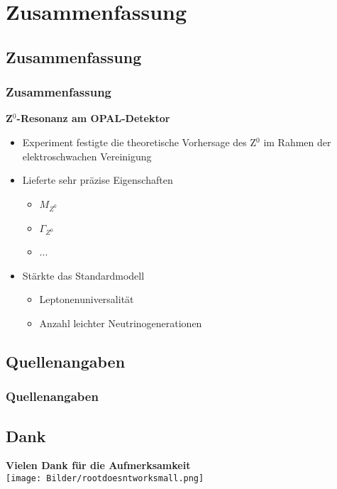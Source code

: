\documentclass{beamer}
\begin{document}
\section{Zusammenfassung}

\subsection{Zusammenfassung}
\begin{frame}
	\frametitle{Zusammenfassung}
	\textbf{Z$^0$-Resonanz am OPAL-Detektor}
	\begin{itemize}
		\item<1-> Experiment festigte die theoretische Vorhersage des Z$^0$ im Rahmen der elektroschwachen Vereinigung
		\item<2-> Lieferte sehr präzise Eigenschaften
		\begin{itemize}
			\item $M_{Z^0}$
			\item $\Gamma_{Z^0}$
			\item ...
		\end{itemize}
		\item<3-> Stärkte das Standardmodell
		\begin{itemize}
			\item Leptonenuniversalität
			\item Anzahl leichter Neutrinogenerationen
		\end{itemize}
	\end{itemize}
\end{frame}

\subsection{Quellenangaben}
\begin{frame}
	\frametitle{Quellenangaben}
	\centering
	\nocite{vakurz}
	\nocite{pdg}
	\nocite{skellam}
	\nocite{ErzeugungreellesZ}
	\nocite{eeWQDiagramm}
	\nocite{Neutrinostreuung}
	\nocite{Resonanzkurve}
	\scriptsize
	
	
\end{frame}

\subsection{Dank}
\begin{frame}
	\centering
	\huge\textbf{Vielen Dank für die Aufmerksamkeit}\\
	\vspace{1cm}
	\texttt{[image: Bilder/rootdoesntworksmall.png]}
\end{frame}
\end{document}
